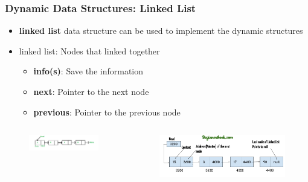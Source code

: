 \documentclass{../c-lecture}
\begin{document}
\begin{frame}
  \frametitle{Dynamic Data Structures: Linked List}
  \begin{itemize}
    \item
      \textbf{\color{Orange} linked list} data structure can be used to
      implement the dynamic structures

    \item linked list: Nodes that linked together
    \begin{itemize}
      \item \textbf{\color{LimeGreen} info(s)}: Save the information
      \item \textbf{\color{Cyan} next}: Pointer to the next node
      \item
        \textbf{\color{Violet} previous}: Pointer to the previous node
    \end{itemize}
  \end{itemize}
\end{frame}

\begin{frame}
  \begin{columns}
    \begin{column}{.5\textwidth}
      \begin{figure}
        \includegraphics[width=\textwidth]{./img/ll-1.png}
      \end{figure}
    \end{column}
    \begin{column}{.5\textwidth}
      \begin{figure}
        \includegraphics[width=\textwidth]{./img/ll-2.png}
      \end{figure}
    \end{column}
  \end{columns}
\end{frame}
\end{document}
